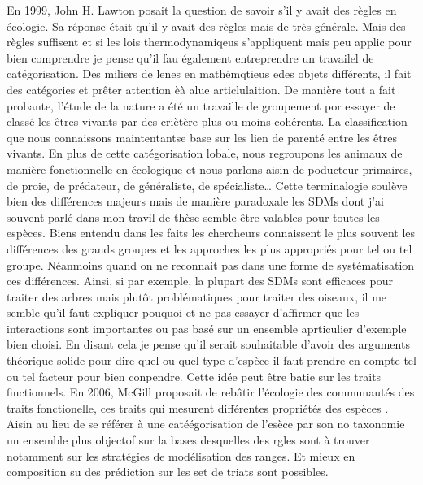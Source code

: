 En 1999, John H. Lawton posait la question de savoir s'il y avait des
règles en écologie. Sa réponse était qu'il y avait des règles mais de
très générale. Mais des règles suffisent et si les lois thermodynamiqeus
s'appliquent mais peu applic pour bien comprendre je pense qu'il fau
également entreprendre un travailel de catégorisation. Des miliers de
lenes en mathémqtieus edes objets différents, il fait des catégories et
prêter attention èà alue articlulaition. De manière tout a fait
probante, l'étude de la nature a été un travaille de groupement por
essayer de classé les êtres vivants par des criètère plus ou moins
cohérents. La classification que nous connaissons maintentantse base sur
les lien de parenté entre les êtres vivants. En plus de cette
catégorisation lobale, nous regroupons les animaux de manière
fonctionnelle en écologique et nous parlons aisin de poducteur
primaires, de proie, de prédateur, de généraliste, de
spécialiste\ldots{} Cette terminalogie soulève bien des différences
majeurs mais de manière paradoxale les SDMs dont j'ai souvent parlé dans
mon travil de thèse semble être valables pour toutes les espèces. Biens
entendu dans les faits les chercheurs connaissent le plus souvent les
différences des grands groupes et les approches les plus appropriés pour
tel ou tel groupe. Néanmoins quand on ne reconnait pas dans une forme de
systématisation ces différences. Ainsi, si par exemple, la plupart des
SDMs sont efficaces pour traiter des arbres mais plutôt problématiques
pour traiter des oiseaux, il me semble qu'il faut expliquer pouquoi et
ne pas essayer d'affirmer que les interactions sont importantes ou pas
basé sur un ensemble aprticulier d'exemple bien choisi. En disant cela
je pense qu'il serait souhaitable d'avoir des arguments théorique solide
pour dire quel ou quel type d'espèce il faut prendre en compte tel ou
tel facteur pour bien conpendre. Cette idée peut être batie sur les
traits finctionnels. En 2006, McGill proposait de rebâtir l'écologie des
communautés des traits fonctionelle, ces traits qui mesurent différentes
propriétés des espèces \citep{McGill2006}. Aisin au lieu de se référer à
une catéégorisation de l'esèce par son no taxonomie un ensemble plus
objectof sur la bases desquelles des rgles sont à trouver notamment sur
les stratégies de modélisation des ranges. Et mieux en composition su
des prédiction sur les set de triats sont possibles.

